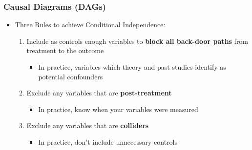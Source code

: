 \documentclass[xcolor=x11names,compress]{beamer}\usepackage[]{graphicx}\usepackage[]{color}
\renewcommand{\(}{\begin{columns}}
\renewcommand{\)}{\end{columns}}
\newcommand{\<}[1]{\begin{column}{#1}}
\renewcommand{\>}{\end{column}}
\begin{document}
\begin{frame}
\frametitle{Causal Diagrams (DAGs)}
\begin{itemize}
\item Three Rules to achieve Conditional Independence:
\begin{enumerate}
\item Include as controls enough variables to \textbf{block all back-door paths} from treatment to the outcome
\pause
\begin{itemize}
\item In practice, variables which theory and past studies identify as potential confounders
\end{itemize}
\pause
\item Exclude any variables that are \textbf{post-treatment}
\pause
\begin{itemize}
\item In practice, know when your variables were measured
\end{itemize}
\pause
\item Exclude any variables that are \textbf{colliders}
\pause
\begin{itemize}
\item In practice, don't include unnecessary controls
\end{itemize}
\end{enumerate}
\end{itemize}
\end{frame}
\end{document}
